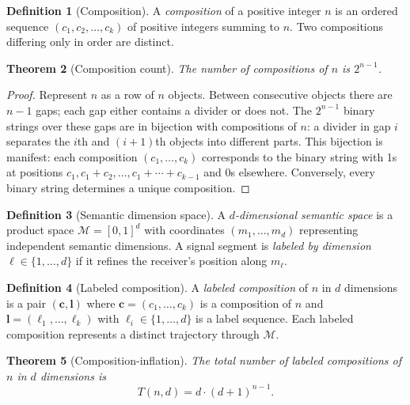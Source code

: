 \documentclass[twocolumn,11pt,a4paper]{article}
\theoremstyle{main}
\newtheorem{theorem}{Theorem}[section]
\theoremstyle{definition}
\newtheorem{definition}[theorem]{Definition}
\theoremstyle{remark}
\newcommand{\Mean}{\mathcal{M}}
\newcommand{\Traj}{T}
\begin{document}
\begin{definition}[Composition]
\label{def:comp}
A \emph{composition} of a positive integer $n$ is an ordered sequence
$(c_1, c_2, \ldots, c_k)$ of positive integers summing to $n$. Two
compositions differing only in order are distinct.
\end{definition}

\begin{theorem}[Composition count]
\label{thm:compcount}
The number of compositions of $n$ is $2^{n-1}$.
\end{theorem}

\begin{proof}
Represent $n$ as a row of $n$ objects. Between consecutive objects
there are $n-1$ gaps; each gap either contains a divider or does not.
The $2^{n-1}$ binary strings over these gaps are in bijection with
compositions of $n$: a divider in gap $i$ separates the $i$th and
$(i+1)$th objects into different parts. This bijection is manifest: each
composition $(c_1, \ldots, c_k)$ corresponds to the binary string with
1s at positions $c_1, c_1+c_2, \ldots, c_1+\cdots+c_{k-1}$ and 0s
elsewhere. Conversely, every binary string determines a unique
composition.
\end{proof}

\begin{definition}[Semantic dimension space]
\label{def:dimspace}
A \emph{$d$-dimensional semantic space} is a product space
$\Mean = [0,1]^d$ with coordinates $(m_1, \ldots, m_d)$ representing
independent semantic dimensions. A signal segment is \emph{labeled by
dimension $\ell \in \{1,\ldots,d\}$} if it refines the receiver's
position along $m_\ell$.
\end{definition}

\begin{definition}[Labeled composition]
\label{def:labeled}
A \emph{labeled composition} of $n$ in $d$ dimensions is a pair
$(\mathbf{c}, \mathbf{l})$ where $\mathbf{c} = (c_1,\ldots,c_k)$ is a
composition of $n$ and $\mathbf{l} = (\ell_1, \ldots, \ell_k)$ with
$\ell_i \in \{1,\ldots,d\}$ is a label sequence. Each labeled
composition represents a distinct trajectory through $\Mean$.
\end{definition}

\begin{theorem}[Composition-inflation]
\label{thm:inflation}
The total number of labeled compositions of $n$ in $d$ dimensions is
\[
  \Traj(n,d) = d \cdot (d+1)^{n-1}.
\]
\end{theorem}
\end{document}

